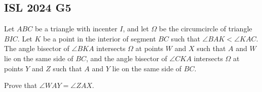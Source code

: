 \documentclass[11pt]{scrartcl}
\begin{document}
\pagebreak

\subsection{ISL 2024 G5}

\begin{example}[ISL 2024 G5]
	Let $ABC$ be a triangle with incenter $I$, and let $\Omega$ be the circumcircle of triangle $BIC$. Let $K$ be a point in the interior of segment $BC$ such that $\angle BAK < \angle KAC$. The angle bisector of $\angle BKA$ intersects $\Omega$ at points $W$ and $X$ such that $A$ and $W$ lie on the same side of $BC$, and the angle bisector of $\angle CKA$ intersects $\Omega$ at points $Y$ and $Z$ such that $A$ and $Y$ lie on the same side of $BC$.

	Prove that $\angle WAY = \angle ZAX$.
\end{example}
\end{document}
